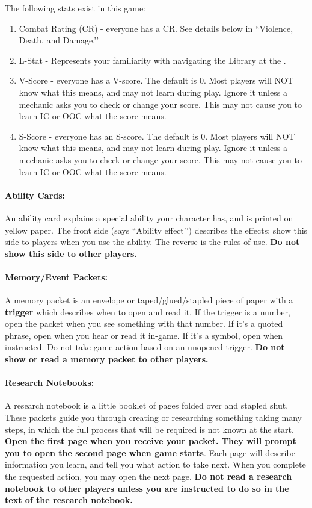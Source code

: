 \documentclass[sheet]{GL2020}
\begin{document}
The following stats exist in this game:
\begin{enumerate}
	\item Combat Rating (CR) - everyone has a CR. See details below in ``Violence, Death, and Damage.’’
	\item L-Stat - Represents your familiarity with navigating the Library at the \pSc{}.
	\item V-Score - everyone has a V-score. The default is 0. Most players will NOT know what this means, and may not learn during play. Ignore it unless a mechanic asks you to check or change your score. This may not cause you to learn IC or OOC what the score means.
	\item S-Score - everyone has an S-score. The default is 0. Most players will NOT know what this means, and may not learn during play. Ignore it unless a mechanic asks you to check or change your score. This may not cause you to learn IC or OOC what the score means.
\end{enumerate}

\paragraph{Ability Cards:} An ability card explains a special ability your character has, and is printed on yellow paper. The front side (says ``Ability effect'’) describes the effects; show this side to players when you use the ability. The reverse is the rules of use. \textbf{Do not show this side to other players.}

\paragraph{Memory/Event Packets:} A memory packet is an envelope or taped/glued/stapled piece of paper with a {\bf trigger} which describes when to open and read it. If the trigger is a number, open the packet when you see something with that number. If it's a quoted phrase, open when you hear or read it in-game. If it's a symbol, open when instructed. Do not take game action based on an unopened trigger. \textbf{Do not show or read a memory packet to other players.}

\paragraph{Research Notebooks:} A research notebook is a little booklet of pages folded over and stapled shut. These packets guide you through creating or researching something taking many steps, in which the full process that will be required is not known at the start. \textbf{Open the first page when you receive your packet. They will prompt you to open the second page when game starts}. Each page will describe information you learn, and tell you what action to take next. When you complete the requested action, you may open the next page. \textbf{Do not read a research notebook to other players unless you are instructed to do so in the text of the research notebook.}
\end{document}

